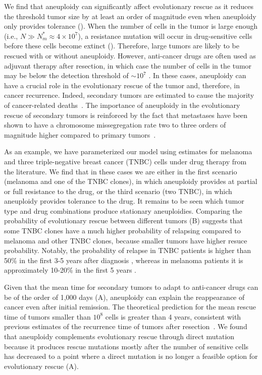 \documentclass[12pt]{extarticle}
\begin{document}
We find that aneuploidy can significantly affect evolutionary rescue as it reduces the threshold tumor size by at least an order of magnitude even when aneuploidy only provides tolerance ().
When the number of cells in the tumor is large enough (i.e., $N \gg N_m^* \approx 4\times10^7$), a resistance mutation will occur in drug-sensitive cells before these cells become extinct (). Therefore, large tumors are likely to be rescued with or without aneuploidy.
However, anti-cancer drugs are often used as adjuvant therapy after resection, in which case the number of cells in the tumor may be below the detection threshold of $\sim10^7$  \citep{bozic2013evolutionary}. In these cases, aneuploidy can have a crucial role in the evolutionary rescue of the tumor and, therefore, in cancer recurrence. Indeed, secondary tumors are estimated to cause the majority of cancer-related deaths~\citep{chaffer2011perspective}. The importance of aneuploidy in the evolutionary rescue of secondary tumors is reinforced by the fact that metastases have been shown to have a chromosome missegregation rate two to three orders of magnitude higher compared to primary tumors~\citep{kimmel2023intra}.

As an example, we have parameterized our model using estimates for melanoma and three triple-negative breast cancer (TNBC) cells under drug therapy from the literature. 
We find that in these cases we are either in the first scenario (melanoma and one of the TNBC clones), in which aneuploidy provides at partial or full resistance to the drug, or the third scenario (two TNBC), in which aneuploidy provides tolerance to the drug. 
It remains to be seen which tumor type and drug combinations produce stationary aneuploidies. %
Comparing the probability of evolutionary rescue between different tumors (B) suggests that some TNBC clones have a much higher probability of relapsing compared to melanoma and other TNBC clones, because smaller tumors have higher resuce probability. Notably, the probability of relapse in TNBC patients is higher than 50\% in the first 3-5 years after diagnosis \citep{taushanova2023synchronous}, whereas in melanoma patients it is approximately 10-20\% in the first 5 years \citep{wan2022prediction,von_schuckmann2019risk}. %

Given that the mean time for secondary tumors to adapt to anti-cancer drugs can be of the order of 1,000 days (A), aneuploidy can explain the reappearance of cancer even after initial remission. The theoretical prediction for the mean rescue time of tumors smaller than $10^8$ cells is greater than 4 years, consistent with previous estimates of the recurrence time of tumors after resection~\citep{avanzini2019cancer}. We found that aneuploidy complements evolutionary rescue through direct mutation because it produces rescue mutations mostly after the number of sensitive cells has decreased to a point where a direct mutation is no longer a feasible option for evolutionary rescue (A).
\end{document}
